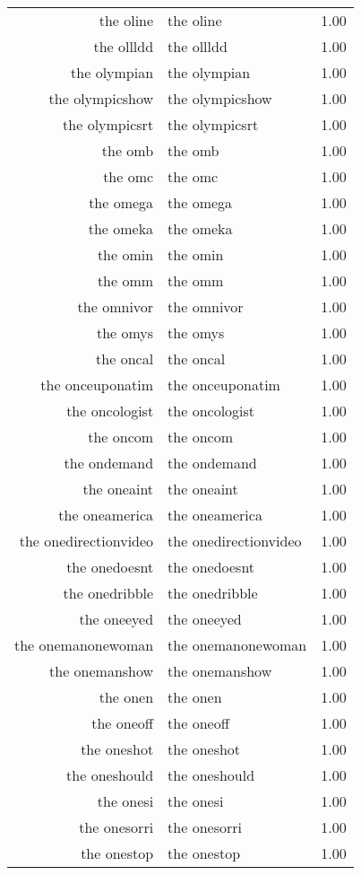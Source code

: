 \begin{table}[ht]
\begin{tabular}{rlr}
  the oline & the oline & 1.00 \\ 
  the ollldd & the ollldd & 1.00 \\ 
  the olympian & the olympian & 1.00 \\ 
  the olympicshow & the olympicshow & 1.00 \\ 
  the olympicsrt & the olympicsrt & 1.00 \\ 
  the omb & the omb & 1.00 \\ 
  the omc & the omc & 1.00 \\ 
  the omega & the omega & 1.00 \\ 
  the omeka & the omeka & 1.00 \\ 
  the omin & the omin & 1.00 \\ 
  the omm & the omm & 1.00 \\ 
  the omnivor & the omnivor & 1.00 \\ 
  the omys & the omys & 1.00 \\ 
  the oncal & the oncal & 1.00 \\ 
  the onceuponatim & the onceuponatim & 1.00 \\ 
  the oncologist & the oncologist & 1.00 \\ 
  the oncom & the oncom & 1.00 \\ 
  the ondemand & the ondemand & 1.00 \\ 
  the oneaint & the oneaint & 1.00 \\ 
  the oneamerica & the oneamerica & 1.00 \\ 
  the onedirectionvideo & the onedirectionvideo & 1.00 \\ 
  the onedoesnt & the onedoesnt & 1.00 \\ 
  the onedribble & the onedribble & 1.00 \\ 
  the oneeyed & the oneeyed & 1.00 \\ 
  the onemanonewoman & the onemanonewoman & 1.00 \\ 
  the onemanshow & the onemanshow & 1.00 \\ 
  the onen & the onen & 1.00 \\ 
  the oneoff & the oneoff & 1.00 \\ 
  the oneshot & the oneshot & 1.00 \\ 
  the oneshould & the oneshould & 1.00 \\ 
  the onesi & the onesi & 1.00 \\ 
  the onesorri & the onesorri & 1.00 \\ 
  the onestop & the onestop & 1.00 \\ 

\end{tabular}
\end{table}
